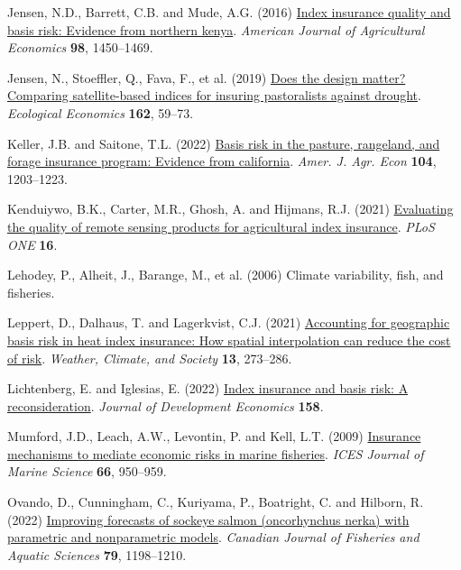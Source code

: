 \documentclass[
  letterpaper,
  DIV=11,
  numbers=noendperiod]{scrartcl}
\newlength{\cslhangindent}
\newlength{\cslentryspacingunit} %
\newenvironment{CSLReferences}[2] %
 {%
  \setlength{\parindent}{0pt}
  \ifodd #1
  \let\oldpar\par
  \def\par{\hangindent=\cslhangindent\oldpar}
  \fi
  \setlength{\parskip}{#2\cslentryspacingunit}
 }%
 {}
\begin{document}
\begin{CSLReferences}{1}{0}
\leavevmode{}%
Jensen, N.D., Barrett, C.B. and Mude, A.G. (2016)
\href{https://doi.org/10.1093/ajae/aaw046}{Index insurance quality and
basis risk: Evidence from northern kenya}. \emph{American Journal of
Agricultural Economics} \textbf{98}, 1450--1469.

\leavevmode{}%
Jensen, N., Stoeffler, Q., Fava, F., et al. (2019)
\href{https://doi.org/10.1016/J.ECOLECON.2019.04.014}{Does the design
matter? Comparing satellite-based indices for insuring pastoralists
against drought}. \emph{Ecological Economics} \textbf{162}, 59--73.

\leavevmode{}%
Keller, J.B. and Saitone, T.L. (2022)
\href{https://doi.org/10.1111/ajae.12282}{Basis risk in the pasture,
rangeland, and forage insurance program: Evidence from california}.
\emph{Amer. J. Agr. Econ} \textbf{104}, 1203--1223.

\leavevmode{}%
Kenduiywo, B.K., Carter, M.R., Ghosh, A. and Hijmans, R.J. (2021)
\href{https://doi.org/10.1371/journal.pone.0258215}{Evaluating the
quality of remote sensing products for agricultural index insurance}.
\emph{PLoS ONE} \textbf{16}.

\leavevmode{}%
Lehodey, P., Alheit, J., Barange, M., et al. (2006) Climate variability,
fish, and fisheries.

\leavevmode{}%
Leppert, D., Dalhaus, T. and Lagerkvist, C.J. (2021)
\href{https://doi.org/10.1175/WCAS-D-20-0070.1}{Accounting for
geographic basis risk in heat index insurance: How spatial interpolation
can reduce the cost of risk}. \emph{Weather, Climate, and Society}
\textbf{13}, 273--286.

\leavevmode{}%
Lichtenberg, E. and Iglesias, E. (2022)
\href{https://doi.org/10.1016/j.jdeveco.2022.102883}{Index insurance and
basis risk: A reconsideration}. \emph{Journal of Development Economics}
\textbf{158}.

\leavevmode{}%
Mumford, J.D., Leach, A.W., Levontin, P. and Kell, L.T. (2009)
\href{https://doi.org/10.1093/icesjms/fsp100}{Insurance mechanisms to
mediate economic risks in marine fisheries}. \emph{ICES Journal of
Marine Science} \textbf{66}, 950--959.

\leavevmode{}%
Ovando, D., Cunningham, C., Kuriyama, P., Boatright, C. and Hilborn, R.
(2022) \href{https://doi.org/10.1139/cjfas-2021-0287}{Improving
forecasts of sockeye salmon (oncorhynchus nerka) with parametric and
nonparametric models}. \emph{Canadian Journal of Fisheries and Aquatic
Sciences} \textbf{79}, 1198--1210.


\end{CSLReferences}
\end{document}
